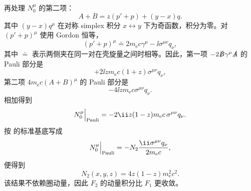 \begin{derivation}
再处理 $N_0^\mu$ 的第二项：
\begin{equation*}
 A+B=z(p'+p)+(y-x)q.
\end{equation*}
其中 $(y-x)q^\mu$ 在对称 simplex 积分 $x\leftrightarrow y$ 下为奇函数，积分为零。对 $(p'+p)^\mu$ 使用 Gordon 恒等，
\begin{equation*}
 (p'+p)^\mu
 \doteq 2m_{\mathrm e} c\gamma^\mu-\ii\sigma^{\mu\nu}q_\nu,
\end{equation*}
其中 $\doteq$ 表示两侧夹在同一对在壳旋量之间时相等。因此，第一项
$-2\slashed B\gamma^\mu\slashed A$ 的 Pauli 部分是
\begin{equation*}
 +2\ii zm_{\mathrm e} c(1+z)\sigma^{\mu\nu}q_\nu,
\end{equation*}
第二项 $4m_{\mathrm e} c(A+B)^\mu$ 的 Pauli 部分是
\begin{equation*}
 -4\ii zm_{\mathrm e} c\sigma^{\mu\nu}q_\nu.
\end{equation*}
相加得到
\begin{equation*}
 N_0^\mu\Big|_{\rm Pauli}
 =-2\ii z(1-z)m_{\mathrm e} c\,\sigma^{\mu\nu}q_\nu.
\end{equation*}
按  的标准基底写成
\begin{equation*}
 N_0^\mu\Big|_{\rm Pauli}
 =-N_2\frac{\ii\sigma^{\mu\nu}q_\nu}{2m_{\mathrm e} c},
\end{equation*}
便得到
\begin{equation*}
 {
 N_2(x,y,z)=4z(1-z)m_{\mathrm e}^2c^2.}
 \end{equation*}
该结果不依赖圈动量，因此 $F_2$ 的动量积分比 $F_1$ 更收敛。
\end{derivation}

